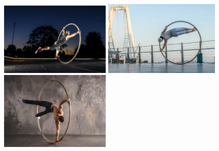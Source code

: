 \begin{figure}[h]
\centering
\includegraphics[width=200]{images_autres/valse.png}
\includegraphics[width=210]{images_autres/corner.png}
\includegraphics[width=200]{images_autres/handspring.png}

\end{figure}
